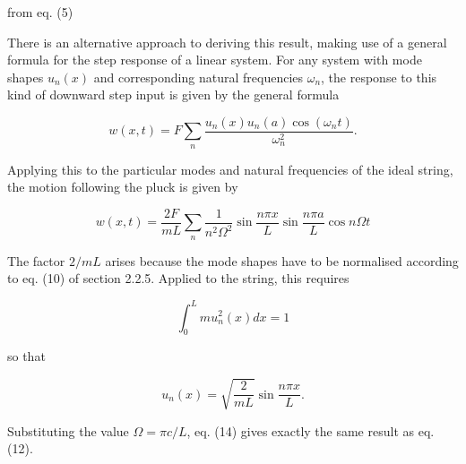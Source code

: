   from eq. (5) 

  There is an alternative approach to deriving this result, making use of a 
  general formula for the step response of a linear system. For any system with 
  mode shapes $u_n(x)$ and corresponding natural frequencies $\omega_n$, the 
  response to this kind of downward step input is given by the general formula 

  $$w(x,t)= F \sum_n{\frac{u_n(x) u_n(a) \cos(\omega_n t)}{\omega_n^2}}. 
  \tag{13}$$ 

  Applying this to the particular modes and natural frequencies of the ideal 
  string, the motion following the pluck is given by 

  $$w(x,t)= \frac{2F}{mL} \sum_n{\frac{1}{ n^2 \Omega^2} \sin \frac{n \pi x}{L} 
  \sin \frac{n \pi a}{L} \cos n \Omega t} \tag{14}$$ 

  The factor $2/mL$ arises because the mode shapes have to be normalised 
  according to eq. (10) of section 2.2.5. Applied to the string, this requires 

  $$\int_0^L{m u_n^2(x) dx}=1 \tag{15}$$ 

  so that 

  $$u_n(x) = \sqrt{\frac{2}{mL}} \sin \frac{n \pi x}{L}. \tag{16}$$ 

  Substituting the value $\Omega= \pi c/L$, eq. (14) gives exactly the same 
  result as eq. (12). 
